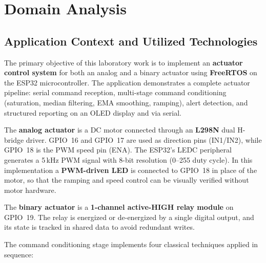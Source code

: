 \section{Domain Analysis}
\subsection{Application Context and Utilized Technologies}

The primary objective of this laboratory work is to implement an \textbf{actuator
control system} for both an analog and a binary actuator using \textbf{FreeRTOS} on
the ESP32 microcontroller. The application demonstrates a complete actuator pipeline:
serial command reception, multi-stage command conditioning (saturation, median filtering,
EMA smoothing, ramping), alert detection, and structured reporting on an OLED display
and via serial.

The \textbf{analog actuator} is a DC motor connected through an \textbf{L298N} dual
H-bridge driver. GPIO~16 and GPIO~17 are used as direction pins (IN1/IN2), while
GPIO~18 is the PWM speed pin (ENA). The ESP32's LEDC peripheral generates a 5\,kHz
PWM signal with 8-bit resolution (0--255 duty cycle). In this implementation a
\textbf{PWM-driven LED} is connected to GPIO~18 in place of the motor, so that the
ramping and speed control can be visually verified without motor hardware.

The \textbf{binary actuator} is a \textbf{1-channel active-HIGH relay module} on
GPIO~19. The relay is energized or de-energized by a single digital output, and its
state is tracked in shared data to avoid redundant writes.

The command conditioning stage implements four classical techniques applied in sequence:

